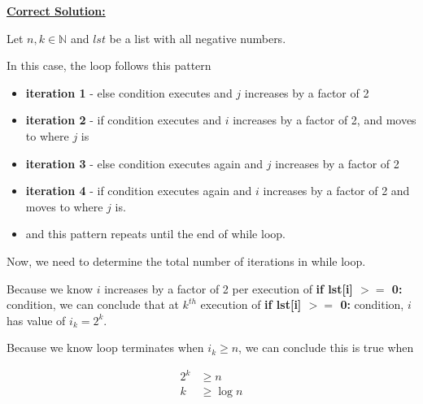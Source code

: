 \documentclass[12pt]{article}
\begin{document}
\begin{enumerate}[a.]
    \bigskip

    \begin{mdframed}
        \underline{\textbf{Correct Solution:}}

        \bigskip

        Let $n,k \in \mathbb{N}$ and $lst$ be a list with all negative numbers.

        \bigskip

        \color{red}
        In this case, the loop follows this pattern

        \begin{itemize}
            \item \textbf{iteration 1} - else condition executes and $j$ increases by a
            factor of 2
            \item \textbf{iteration 2} - if condition executes and $i$ increases by a
            factor of 2, and moves to where $j$ is
            \item \textbf{iteration 3} - else condition executes again and $j$ increases
            by a factor of 2
            \item \textbf{iteration 4} - if condition executes again and $i$ increases
            by a factor of 2 and moves to where $j$ is.
            \item and this pattern repeats until the end of while loop.

        \end{itemize}

        \bigskip

        Now, we need to determine the total number of iterations in while loop.

        \color{black}

        \bigskip

        Because we know $i$ increases by a factor of 2 per \color{red}execution of
        \textbf{if lst[i] $>=$ 0:} condition, we can conclude that at $k^{th}$ \color{red}execution
        of \textbf{if lst[i] $>=$ 0:} condition\color{black}, $i$ has value of $i_k = 2^k$.

        \bigskip

        Because we know loop terminates when $i_k \geq n$, we can conclude this is true
        when

        \setcounter{equation}{0}
        \begin{align}
            2^k &\geq n\\
            k &\geq \log n
        \end{align}


\end{mdframed}
\end{enumerate}
\end{document}

